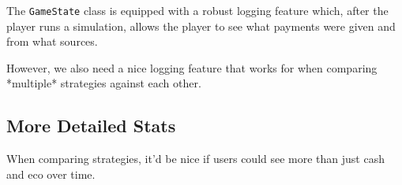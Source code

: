 \documentclass[12pt,letterpaper]{article}
\theoremstyle{remark}
\theoremstyle{plain}
\begin{document}
The \texttt{GameState} class is equipped with a robust logging feature which, after the player runs a simulation, allows the player to see what payments were given and from what sources.

However, we also need a nice logging feature that works for when comparing *multiple* strategies against each other.

\subsection{More Detailed Stats}

When comparing strategies, it'd be nice if users could see more than just cash and eco over time.
\end{document}
